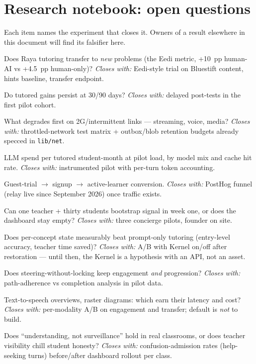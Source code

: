 \documentclass[11pt,a4paper]{article}
\let\oldsection\section
\renewcommand{\section}{\clearpage\oldsection}
\begin{document}
\section{Research notebook: open questions}
\label{sec:notebook}

Each item names the experiment that closes it. Owners of a result elsewhere in
this document will find its falsifier here.

\begin{description}[leftmargin=!,labelwidth=3em]
\item[R1 Transfer.] Does Raya tutoring transfer to \emph{new} problems (the
Eedi metric, +10~pp human-AI vs +4.5~pp human-only)? \emph{Closes with:}
Eedi-style trial on Bluestift content, hints baseline, transfer endpoint.
\item[R2 Retention.] Do tutored gains persist at 30/90 days? \emph{Closes
with:} delayed post-tests in the first pilot cohort.
\item[R3 Low-connectivity.] What degrades first on 2G/intermittent links ---
streaming, voice, media? \emph{Closes with:} throttled-network test matrix +
outbox/blob retention budgets already specced in \texttt{lib/net}.
\item[R4 Unit cost.] LLM spend per tutored student-month at pilot load, by
model mix and cache hit rate. \emph{Closes with:} instrumented pilot with
per-turn token accounting.
\item[R5 Funnel.] Guest-trial $\to$ signup $\to$ active-learner conversion.
\emph{Closes with:} PostHog funnel (relay live since September 2026) once
traffic exists.
\item[R6 Cold start.] Can one teacher + thirty students bootstrap signal in
week one, or does the dashboard stay empty? \emph{Closes with:} three
concierge pilots, founder on site.
\item[R7 Kernel value.] Does per-concept state measurably beat prompt-only
tutoring (entry-level accuracy, teacher time saved)? \emph{Closes with:}
A/B with Kernel on/off after restoration --- until then, the Kernel is a
hypothesis with an API, not an asset.
\item[R8 Mastery without gates.] Does steering-without-locking keep engagement
\emph{and} progression? \emph{Closes with:} path-adherence vs completion
analysis in pilot data.
\item[R9 Modality frontier.] Text-to-speech overviews, raster diagrams: which
earn their latency and cost? \emph{Closes with:} per-modality A/B on
engagement and transfer; default is \emph{not} to build.
\item[R10 Framing.] Does ``understanding, not surveillance'' hold in real
classrooms, or does teacher visibility chill student honesty? \emph{Closes
with:} confusion-admission rates (help-seeking turns) before/after dashboard
rollout per class.
\end{description}
\end{document}
